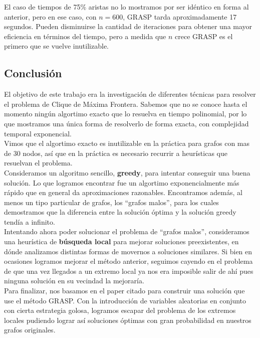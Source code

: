 El caso de tiempos de 75\% aristas no lo mostramos por ser idéntico en forma al anterior, pero en ese caso, con $n = 600$, GRASP tarda aproximadamente 17 segundos. Pueden disminuirse la cantidad de iteraciones para obtener una mayor eficiencia en términos del tiempo, pero a medida que $n$ crece GRASP es el primero que se vuelve inutilizable.



\subsection{Conclusión}

El objetivo de este trabajo era la investigación de diferentes técnicas para resolver el problema de Clique de Máxima Frontera. Sabemos que no se conoce hasta el momento ningún algortimo exacto que lo resuelva en tiempo polinomial, por lo que mostramos una única forma de resolverlo de forma exacta, con complejidad temporal exponencial. \\

Vimos que el algortimo exacto es inutilizable en la práctica para grafos con mas de 30 nodos, así que en la práctica es necesario recurrir a heurísticas que resuelvan el problema. \\

Consideramos un algoritmo sencillo, \textbf{greedy}, para intentar conseguir una buena solución. Lo que logramos encontrar fue un algortimo exponencialmente más rápido que en general da aproximaciones razonables. Encontramos además, al menos un tipo particular de grafos, los ``grafos malos'', para los cuales demostramos que la diferencia entre la solución óptima y la solución greedy tendía a infinito. \\

Intentando ahora poder solucionar el problema de ``grafos malos'', consideramos una heurística de \textbf{búsqueda local} para mejorar soluciones preexistentes, en dónde analizamos distintas formas de movernos a soluciones similares. Si bien en ocasiones logramos mejorar el método anterior, seguimos cayendo en el problema de que una vez llegados a un extremo local ya nos era imposible salir de ahí pues ninguna solución en su vecindad la mejoraría. \\

Para finalizar, nos basamos en el paper citado \cite{paper_grasp} para construir una solución que use el método GRASP. Con la introducción de variables aleatorias en conjunto con cierta estrategia golosa, logramos escapar del problema de los extremos locales pudiendo lograr así soluciones óptimas con gran probabilidad en nuestros grafos originales. \\

